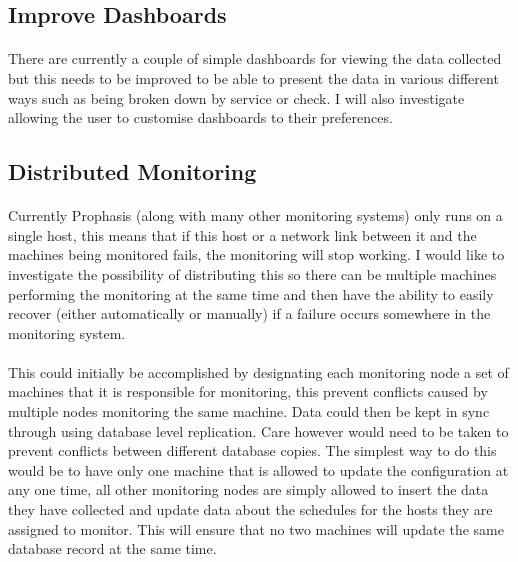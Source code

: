 \documentclass[bsc,logo,twoside]{infthesis}
\begin{document}
\subsection{Improve Dashboards}
\paragraph*{}
	There are currently a couple of simple dashboards for viewing the data
	collected but this needs to be improved to be able to present the data in
	various different ways such as being broken down by service or check. I will
	also investigate allowing the user to customise dashboards to their
	preferences.

\subsection{Distributed Monitoring}
\paragraph*{}
	Currently Prophasis (along with many other monitoring systems) only runs on a
	single host, this means that if this host or a network link between it and the
	machines being monitored fails, the monitoring will stop working. I would like
	to investigate the possibility of distributing this so there can be multiple
	machines performing the monitoring at the same time and then have the ability
	to easily recover (either automatically or manually) if a failure occurs
	somewhere in the monitoring system.
	
\paragraph*{}
	This could initially be accomplished by designating each monitoring node a set
	of machines that it is responsible for monitoring, this prevent conflicts
	caused by multiple nodes monitoring the same machine.  Data could then be kept
	in sync through using database level replication.  Care however would need to
	be taken to prevent conflicts between different database copies. The simplest
	way to do this would be to have only one machine that is allowed to update the
	configuration at any one time, all other monitoring nodes are simply allowed
	to insert the data they have collected and update data about the schedules for
	the hosts they are assigned to monitor.  This will ensure that no two machines
	will update the same database record at the same time.
	
\end{document}
